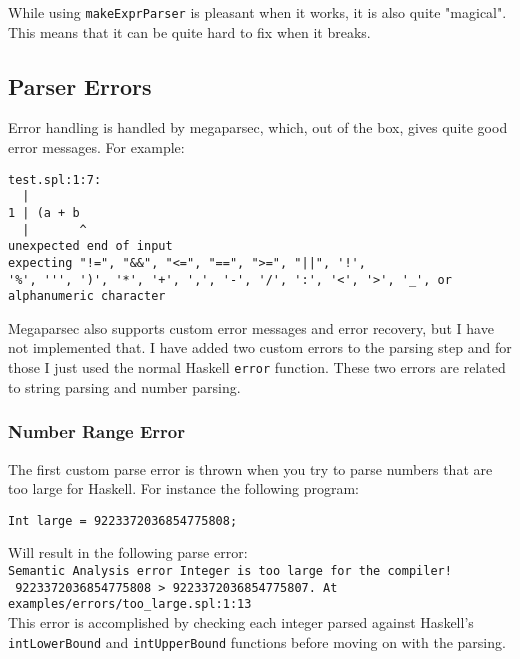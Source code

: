 \documentclass{report}
\begin{document}
While using \texttt{makeExprParser} is pleasant when it works, it is also quite "magical". This means that it can be quite hard to fix when it breaks. 

\subsection{Parser Errors}

Error handling is handled by megaparsec, which, out of the box, gives quite good error messages. For example:

\begin{verbatim}
test.spl:1:7:
  |
1 | (a + b
  |       ^
unexpected end of input
expecting "!=", "&&", "<=", "==", ">=", "||", '!',
'%', ''', ')', '*', '+', ',', '-', '/', ':', '<', '>', '_', or alphanumeric character
\end{verbatim}

\noindent Megaparsec also supports custom error messages and error recovery, but I have not implemented that. I have added two custom errors to the parsing step and for those I just used the normal Haskell \texttt{error} function. These two errors are related to string parsing and number parsing.

\subsubsection{Number Range Error}
The first custom parse error is thrown when you try to parse numbers that are too large for Haskell. For instance the following program:

\begin{lstlisting}[style=SPL]
Int large = 9223372036854775808;
\end{lstlisting}

\noindent Will result in the following parse error: \vspace{0.1cm}\\
\noindent\texttt{\textcolor{error}{Semantic Analysis error} {Integer is too large for the compiler!\\} \textcolor{literal}{9223372036854775808} > \textcolor{literal}{9223372036854775807}. At \textcolor{filename}{examples/errors/too\_large.spl:1:13}}
\vspace{0.1cm}\\
\noindent This error is accomplished by checking each integer parsed against Haskell's \texttt{intLowerBound} and \texttt{intUpperBound} functions before moving on with the parsing.
\end{document}
